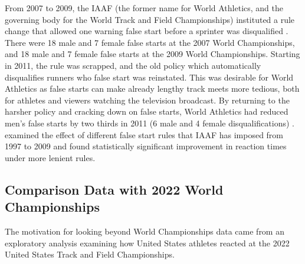 \documentclass[12pt, letterpaper, titlepage]{article}
\begin{document}
From 2007 to 2009, the IAAF (the former name for World Athletics, and the 
governing body for the World Track and Field Championships) instituted a rule 
change that allowed one warning false start before a sprinter was disqualified 
\citep{iaaf2009falsestart}. There were 18 male and 7 female false starts at the 
2007 World Championships, and 18 male and 7 female false starts at the 2009 World 
Championships. Starting in 2011, the rule was scrapped, and the old policy which
automatically disqualifies runners who false start was reinstated. This was 
desirable for World Athletics as false starts can make already lengthy track 
meets more tedious, both for athletes and viewers watching the television 
broadcast. By returning to the harsher policy and cracking down on false starts,
World Athletics had reduced men's false starts by two thirds in 2011 (6 male and
4 female disqualifications) \citep{iaaf2009falsestart}. \citet{haugen2013effect}
examined the effect of different false start rules that IAAF has imposed from 
1997 to 2009 and found statistically significant improvement in reaction times 
under more lenient rules.


\subsection{Comparison Data with 2022 World Championships}\label{sec:databeyond}
The motivation for looking beyond World Championships data came from an 
exploratory analysis examining how United States athletes reacted at the 
2022 United States Track and Field Championships.
\end{document}
